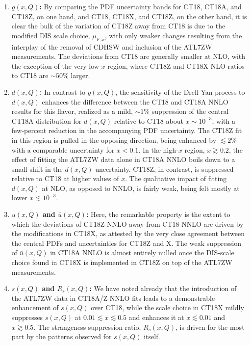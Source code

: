 \begin{enumerate}
\item {\bf $g(x,Q)$:} By comparing the PDF uncertainty bands for CT18,
CT18A, and CT18Z, on one hand, and CT18, CT18X, and CT18Z, on the
other hand, it is clear the bulk of the variation of CT18Z away from
CT18 is due to the modified DIS scale choice, $\mu_{F,x}$, with only
weaker changes resulting from the interplay of the removal of CDHSW
and inclusion of the ATL7ZW measurements. The deviations from CT18
are generally smaller at NLO, with the exception of the very low-$x$
region, where CT18Z and CT18X NLO ratios to CT18 are $\sim\! 50\%$ larger.
%
\item {\bf $d(x,Q)$:} In contrast to $g(x,Q)$, the sensitivity
of the Drell-Yan process to $d(x,Q)$ enhances the difference
between the CT18 and CT18A NNLO results for this flavor, realized as a
mild, $\sim\!1\%$ suppression of the central CT18A distribution for
$d(x,Q)$ relative to CT18 about $x\!\sim\!10^{-3}$, with a
few-percent reduction in the accompanying PDF uncertainty. The CT18Z
fit in this region is pulled in the opposing direction, being enhanced
by $\lesssim\!2\%$ with a comparable uncertainty for $x\!<\! 0.1$. In
the high-$x$ region,
$x \gtrsim 0.2$, the effect of fitting the ATL7ZW data
alone in CT18A NNLO boils down to a small shift in the $d(x,Q)$
uncertainty. CT18Z, in contrast, is suppressed relative to CT18 at higher values of $x$. 
The qualitative impact of fitting $d(x,Q)$ at NLO, as opposed
to NNLO, is fairly weak, being felt mostly at lower $x\!\lesssim\!
10^{-3}$.
%
\item {\bf $u(x,Q)$ and $\bar u(x,Q)$:} Here, the remarkable property
is the extent to which the deviations of CT18Z NNLO away from CT18
NNLO are driven by the modifications in CT18X, as attested by the very
close agreement between the central PDFs and uncertainties 
for CT18Z and X. The weak suppression of $\bar{u}(x,Q)$
in CT18A NNLO is almost entirely nulled once the DIS-scale
choice found in CT18X is implemented in CT18Z on top of the ATL7ZW measurements.
\item {\bf $s(x,Q)$ and $R_s(x,Q)$:} We have noted already
that the introduction of the ATL7ZW data in
CT18A/Z NNLO fits leads to a demonstrable enhancement of $s(x,Q)$ over
CT18, while the scale choice in CT18X mildly suppresses $s(x,Q)$ at
$0.01 \lesssim x \lesssim 0.5$ and enhances it at $x \lesssim 0.01$ and 
$x \gtrsim 0.5$. The strangeness suppression ratio, $R_s(x,Q)$,
is driven for the most part by the patterns observed for $s(x,Q)$ itself.
\end{enumerate}


